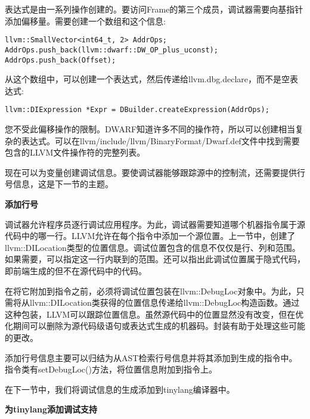 表达式是由一系列操作创建的。要访问Frame的第三个成员，调试器需要向基指针添加偏移量。需要创建一个数组和这个信息:

\begin{lstlisting}[caption={}]
llvm::SmallVector<int64_t, 2> AddrOps;
AddrOps.push_back(llvm::dwarf::DW_OP_plus_uconst);
AddrOps.push_back(Offset);
\end{lstlisting}

从这个数组中，可以创建一个表达式，然后传递给llvm.dbg.declare，而不是空表达式:\par

\begin{lstlisting}[caption={}]
llvm::DIExpression *Expr = DBuilder.createExpression(AddrOps);
\end{lstlisting}

您不受此偏移操作的限制。DWARF知道许多不同的操作符，所以可以创建相当复杂的表达式。可以在llvm/include/llvm/BinaryFormat/Dwarf.def文件中找到需要包含的LLVM文件操作符的完整列表。\par

现在可以为变量创建调试信息。要使调试器能够跟踪源中的控制流，还需要提供行号信息，这是下一节的主题。\par


\hspace*{\fill} \par %
\textbf{添加行号}

调试器允许程序员逐行调试应用程序。为此，调试器需要知道哪个机器指令属于源代码中的哪一行。LLVM允许在每个指令中添加一个源位置。上一节中，创建了llvm::DILocation类型的位置信息。调试位置包含的信息不仅仅是行、列和范围。如果需要，可以指定这一行内联到的范围。还可以指出此调试位置属于隐式代码，即前端生成的但不在源代码中的代码。\par

在将它附加到指令之前，必须将调试位置包装在llvm::DebugLoc对象中。为此，只需将从llvm::DILocation类获得的位置信息传递给llvm::DebugLoc构造函数。通过这种包装，LLVM可以跟踪位置信息。虽然源代码中的位置显然没有改变，但在优化期间可以删除为源代码级语句或表达式生成的机器码。封装有助于处理这些可能的更改。\par

添加行号信息主要可以归结为从AST检索行号信息并将其添加到生成的指令中。指令类有setDebugLoc()方法，将位置信息附加到指令上。\par

在下一节中，我们将调试信息的生成添加到tinylang编译器中。\par

\hspace*{\fill} \par %
\textbf{为tinylang添加调试支持}

